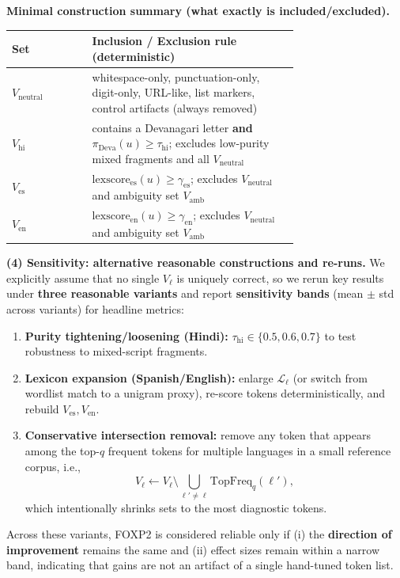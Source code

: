 \begin{itemize}[leftmargin=1.5em]
\begin{description}
\vspace{6pt}
\textbf{Minimal construction summary (what exactly is included/excluded).}
\begin{center}
\small
\begin{tabular}{@{}lp{0.72\linewidth}@{}}
\toprule
\textbf{Set} & \textbf{Inclusion / Exclusion rule (deterministic)} \\
\midrule
$V_{\mathrm{neutral}}$ & whitespace-only, punctuation-only, digit-only, URL-like, list markers, control artifacts (always removed) \\
$V_{\mathrm{hi}}$ & contains a Devanagari letter \textbf{and} $\pi_{\mathrm{Deva}}(u)\ge \tau_{\mathrm{hi}}$; excludes low-purity mixed fragments and all $V_{\mathrm{neutral}}$ \\
$V_{\mathrm{es}}$ & $\mathrm{lexscore}_{\mathrm{es}}(u)\ge \gamma_{\mathrm{es}}$; excludes $V_{\mathrm{neutral}}$ and ambiguity set $V_{\mathrm{amb}}$ \\
$V_{\mathrm{en}}$ & $\mathrm{lexscore}_{\mathrm{en}}(u)\ge \gamma_{\mathrm{en}}$; excludes $V_{\mathrm{neutral}}$ and ambiguity set $V_{\mathrm{amb}}$ \\
\bottomrule
\end{tabular}
\end{center}

\vspace{8pt}
\textbf{(4) Sensitivity: alternative reasonable constructions and re-runs.}
We explicitly assume that no single $V_\ell$ is uniquely correct, so we rerun key results under \textbf{three reasonable variants} and report \textbf{sensitivity bands} (mean $\pm$ std across variants) for headline metrics:
\begin{enumerate}[leftmargin=*,itemsep=2pt]
\item \textbf{Purity tightening/loosening (Hindi):} $\tau_{\mathrm{hi}}\in\{0.5,0.6,0.7\}$ to test robustness to mixed-script fragments.
\item \textbf{Lexicon expansion (Spanish/English):} enlarge $\mathcal{L}_\ell$ (or switch from wordlist match to a unigram proxy), re-score tokens deterministically, and rebuild $V_{\mathrm{es}},V_{\mathrm{en}}$.
\item \textbf{Conservative intersection removal:} remove any token that appears among the top-$q$ frequent tokens for multiple languages in a small reference corpus, i.e.,
\[
V_{\ell}\leftarrow V_{\ell}\setminus \bigcup_{\ell'\neq \ell}\mathrm{TopFreq}_q(\ell'),
\]
which intentionally shrinks sets to the most diagnostic tokens.
\end{enumerate}
Across these variants, FOXP2 is considered reliable only if (i) the \textbf{direction of improvement} remains the same and (ii) effect sizes remain within a narrow band, indicating that gains are not an artifact of a single hand-tuned token list.


\end{description}
\end{itemize}
